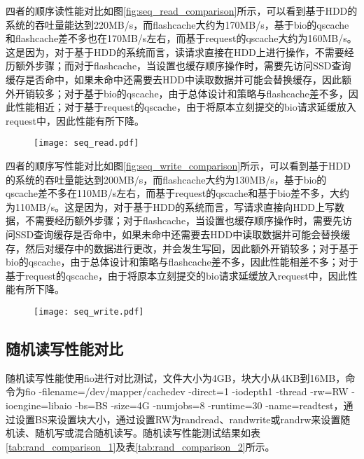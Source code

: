 四者的顺序读性能对比如图\ref{fig:seq_read_comparison}所示，可以看到基于HDD的系统的吞吐量能达到220MB/s，而flashcache大约为170MB/s，基于bio的qscache和flashcache差不多也在170MB/s左右，而基于request的qscache大约为160MB/s。这是因为，对于基于HDD的系统而言，读请求直接在HDD上进行操作，不需要经历额外步骤；而对于flashcache，当设置也缓存顺序操作时，需要先访问SSD查询缓存是否命中，如果未命中还需要去HDD中读取数据并可能会替换缓存，因此额外开销较多；对于基于bio的qscache，由于总体设计和策略与flashcache差不多，因此性能相近；对于基于request的qscache，由于将原本立刻提交的bio请求延缓放入request中，因此性能有所下降。

\begin{figure}[H]
    \centering
    \texttt{[image: seq\_read.pdf]}
\end{figure}

四者的顺序写性能对比如图\ref{fig:seq_write_comparison}所示，可以看到基于HDD的系统的吞吐量能达到200MB/s，而flashcache大约为130MB/s，基于bio的qscache差不多在110MB/s左右，而基于request的qscache和基于bio差不多，大约为110MB/s。这是因为，对于基于HDD的系统而言，写请求直接向HDD上写数据，不需要经历额外步骤；对于flashcache，当设置也缓存顺序操作时，需要先访问SSD查询缓存是否命中，如果未命中还需要去HDD中读取数据并可能会替换缓存，然后对缓存中的数据进行更改，并会发生写回，因此额外开销较多；对于基于bio的qscache，由于总体设计和策略与flashcache差不多，因此性能相差不多；对于基于request的qscache，由于将原本立刻提交的bio请求延缓放入request中，因此性能有所下降。

\begin{figure}[H]
    \centering
    \texttt{[image: seq\_write.pdf]}
\end{figure}

\subsection{随机读写性能对比}

随机读写性能使用fio进行对比测试，文件大小为4GB，块大小从4KB到16MB，命令为fio -filename=/dev/mapper/cachedev -direct=1 -iodepth1 -thread -rw=RW -ioengine=libaio -bs=BS -size=4G -numjobs=8 -runtime=30 -name=readtest，通过设置BS来设置块大小，通过设置RW为randread、randwrite或randrw来设置随机读、随机写或混合随机读写。随机读写性能测试结果如表\ref{tab:rand_comparison_1}及表\ref{tab:rand_comparison_2}所示。

